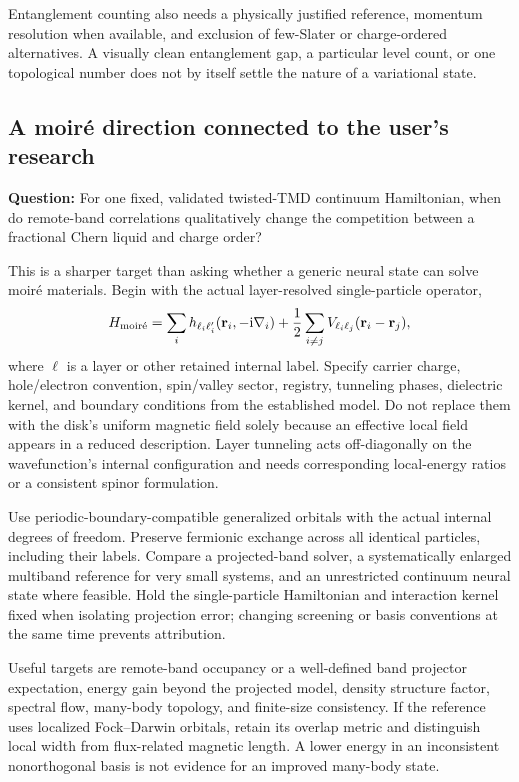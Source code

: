 \documentclass[11pt,letterpaper]{article}
\newcommand{\rr}{\mathbf r}
\newcommand{\ii}{\mathrm i}
\begin{document}
Entanglement counting also needs a physically justified reference, momentum resolution when available, and exclusion of few-Slater or charge-ordered alternatives. A visually clean entanglement gap, a particular level count, or one topological number does not by itself settle the nature of a variational state.

\subsection{A moir\'e direction connected to the user's research}

\textbf{Question:} For one fixed, validated twisted-TMD continuum Hamiltonian, when do remote-band correlations qualitatively change the competition between a fractional Chern liquid and charge order?

This is a sharper target than asking whether a generic neural state can solve moir\'e materials. Begin with the actual layer-resolved single-particle operator,
\begin{equation}
 H_{\rm moir\acute e}=\sum_i h_{\ell_i\ell_i'}(\rr_i,-\ii\nabla_i)
 +\frac12\sum_{i\ne j}V_{\ell_i\ell_j}(\rr_i-\rr_j),
\end{equation}
where $\ell$ is a layer or other retained internal label. Specify carrier charge, hole/electron convention, spin/valley sector, registry, tunneling phases, dielectric kernel, and boundary conditions from the established model. Do not replace them with the disk's uniform magnetic field solely because an effective local field appears in a reduced description. Layer tunneling acts off-diagonally on the wavefunction's internal configuration and needs corresponding local-energy ratios or a consistent spinor formulation.

Use periodic-boundary-compatible generalized orbitals with the actual internal degrees of freedom. Preserve fermionic exchange across all identical particles, including their labels. Compare a projected-band solver, a systematically enlarged multiband reference for very small systems, and an unrestricted continuum neural state where feasible. Hold the single-particle Hamiltonian and interaction kernel fixed when isolating projection error; changing screening or basis conventions at the same time prevents attribution.

Useful targets are remote-band occupancy or a well-defined band projector expectation, energy gain beyond the projected model, density structure factor, spectral flow, many-body topology, and finite-size consistency. If the reference uses localized Fock--Darwin orbitals, retain its overlap metric and distinguish local width from flux-related magnetic length. A lower energy in an inconsistent nonorthogonal basis is not evidence for an improved many-body state.
\end{document}
